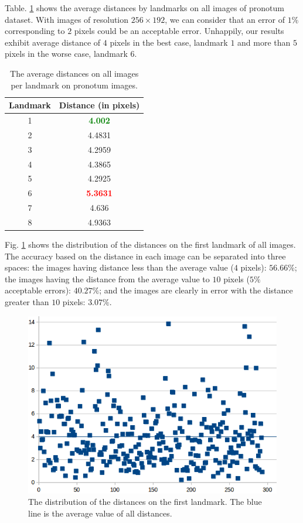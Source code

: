 \documentclass[review]{elsarticle}
\begin{document}
Table. \ref{tblavgpronotum} shows the average distances by landmarks on all images of pronotum dataset. With images of resolution $256 \times 192$, we can consider that an error of $1\%$ corresponding to $2$ pixels could
be an acceptable error. Unhappily, our results exhibit average
distance of $4$ pixels in the best case, landmark $1$ and more than
$5$ pixels in the worse case, landmark $6$.

\begin{table}[htbp]
	\centering	
	\begin{tabular}{|c|c|}
		\hline
		\textbf{Landmark} & \textbf{Distance} (in pixels) \\ \hline
		1 & \textcolor{green}{\textbf{4.002}}  \\ \hline
		2 & 4.4831 \\ \hline
		3 & 4.2959 \\ \hline
		4 & 4.3865 \\ \hline
		5 & 4.2925 \\ \hline
		6 & \textcolor{red}{\textbf{5.3631}} \\ \hline
		7 & 4.636 \\ \hline
		8 & 4.9363 \\ \hline
	\end{tabular}
	\caption{The average distances on all images per landmark on pronotum images.}
	\label{tblavgpronotum}
\end{table}

Fig. \ref{figchartlm1} shows the distribution of the distances on the first landmark of all images. The accuracy based on the distance in each image can be
separated into three spaces: the images having distance less
than the average value ($4$ pixels): $56.66\%$; the images having the
distance from the average value to $10$ pixels ($5\%$ acceptable errors): $40.27\%$; and the images are clearly in error with the distance greater than $10$ pixels: $3.07\%$.

\begin{figure}[htbp]
	\centerline{\includegraphics[scale=0.3]{images/statistic_pronotum_from_scratch_lm1}}
	\caption{The distribution of the distances on the first landmark. The blue line is the average value of all distances.}
	\label{figchartlm1}
\end{figure}
\end{document}
